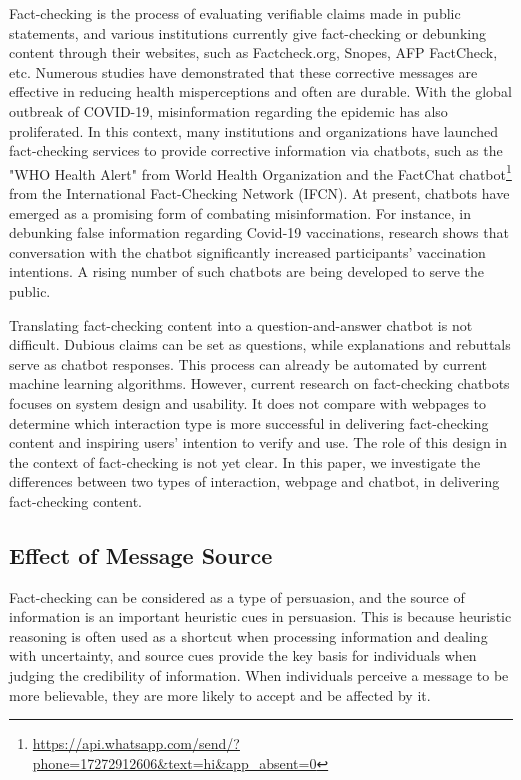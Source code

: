 Fact-checking is the process of evaluating verifiable claims made in public statements\cite[]{brandtzaeg2017trust}, and various institutions currently give fact-checking or debunking content through their websites\cite[]{pal2019communicating}, such as Factcheck.org, Snopes, AFP FactCheck, etc.
Numerous studies have demonstrated that these corrective messages are effective in reducing health misperceptions\cite[]{walter2018unring,bode2018see,lee2020effects} and often are durable\cite[]{porter2021global}.
With the global outbreak of COVID-19, misinformation regarding the epidemic has also proliferated. 
In this context, many institutions and organizations have launched fact-checking services to provide corrective information via chatbots, such as the "WHO Health Alert"\cite[]{walwema2021health} from World Health Organization and the FactChat chatbot\footnote{\url{https://api.whatsapp.com/send/?phone=17272912606&text=hi&app_absent=0}} from the International Fact-Checking Network (IFCN). 
At present, chatbots have emerged as a promising form of combating misinformation.
For instance, in debunking false information regarding Covid-19 vaccinations, research shows that conversation with the chatbot significantly increased participants' vaccination intentions\cite[]{altay2021information}.
A rising number of such chatbots\cite[]{rodsawang2020designing,roque2021botcovid,siedlikowski2021chloe, almalki2020health} are being developed to serve the public.

Translating fact-checking content into a question-and-answer chatbot is not difficult.
Dubious claims can be set as questions, while explanations and rebuttals serve as chatbot responses.
This process can already be automated by current machine learning algorithms\cite[]{gupta2021dialfact,kotonya2020explainable}.
However, current research on fact-checking chatbots focuses on system design and usability. It does not compare with webpages to determine which interaction type is more successful in delivering fact-checking content and inspiring users' intention to verify and use.
The role of this design in the context of fact-checking is not yet clear. 
In this paper, we investigate the differences between two types of interaction, webpage and chatbot, in delivering fact-checking content. 

\subsection{Effect of Message Source}
Fact-checking can be considered as a type of persuasion\cite[]{garrett2013undermining}, and the source of information is an important heuristic cues in persuasion\cite[]{mondak1993public}.
This is because heuristic reasoning is often used as a shortcut when processing information and dealing with uncertainty\cite[]{kahan2010fears,chaiken1980heuristic}, and source cues provide the key basis for individuals when judging the credibility of information. 
When individuals perceive a message to be more believable, they are more likely to accept and be affected by it\cite{austin1994source}.

